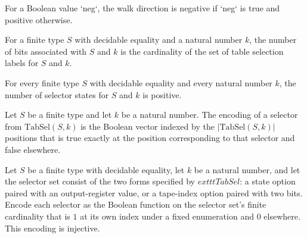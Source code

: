 \begin{definition}
\label{Complexity.Meyer.walkDir}
\leanok
For a Boolean value `neg`, the walk direction is negative if `neg` is true and positive
otherwise.
\end{definition}

\begin{definition}
\label{Complexity.Meyer.nbitsOf}
\leanok
{}
For a finite type $S$ with decidable equality and a natural number $k$, the number of
bits associated with $S$ and $k$ is the cardinality of the set of table selection labels
for $S$ and $k$.
\end{definition}

\begin{theorem}
\label{Complexity.Meyer.nbitsOf_pos}
\leanok
{}
For every finite type $S$ with decidable equality and every natural number $k$, the
number of selector states for $S$ and $k$ is positive.
\end{theorem}

\begin{definition}
\label{Complexity.Meyer.encodeSel}
\leanok
{}
Let $S$ be a finite type and let $k$ be a natural number. The encoding of a selector
from $\mathrm{TabSel}(S,k)$ is the Boolean vector indexed by the
$|\mathrm{TabSel}(S,k)|$ positions that is true exactly at the position corresponding to
that selector and false elsewhere.
\end{definition}

\begin{theorem}
\label{Complexity.Meyer.encodeSel_injective}
\leanok
{}
Let $S$ be a finite type with decidable equality, let $k$ be a natural number, and let
the selector set consist of the two forms specified by $	exttt{TabSel}$: a state option
paired with an output-register value, or a tape-index option paired with two bits.
Encode each selector as the Boolean function on the selector set’s finite cardinality
that is $1$ at its own index under a fixed enumeration and $0$ elsewhere. This encoding
is injective.
\end{theorem}

